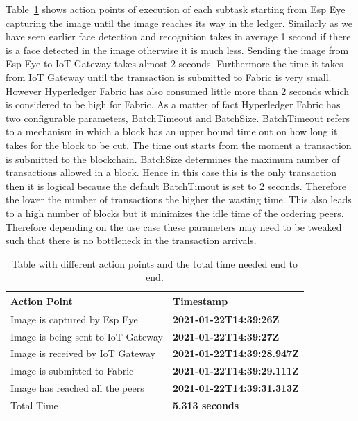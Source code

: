 Table~\ref{actionpoint} shows action points of execution of each subtask starting from Esp Eye capturing the image until the image reaches its way in the ledger. Similarly as we have seen earlier face detection and recognition takes in average 1 second if there is a face detected in the image otherwise it is much less. Sending the image from Esp Eye to IoT Gateway takes almost 2 seconds. Furthermore the time it takes from IoT Gateway until the transaction is submitted to Fabric is very small. 
However Hyperledger Fabric has also consumed little more than 2 seconds which is considered to be high for Fabric. As a matter of fact Hyperledger Fabric has two configurable parameters, BatchTimeout and BatchSize. BatchTimeout refers to a mechanism in which a block has an upper bound time out on how long it takes for the block to be cut. The time out starts from the moment a transaction is submitted to the blockchain. BatchSize determines the maximum number of transactions allowed in a block. 
Hence in this case this is the only transaction then it is logical because the default BatchTimout is set to 2 seconds. Therefore the lower the number of transactions the higher the wasting time. This also leads to a high number of blocks but it minimizes the idle time of the ordering peers. Therefore depending on the use case these parameters may need to be tweaked such that there is no bottleneck in the transaction arrivals.  




\begin{table}[hbt!]

    
    \begin{tabular}{  p{7.4cm}  p{7.4cm}   }
      
\textbf{Action Point}      
& \textbf{Timestamp}   
\\\midrule
Image is captured by Esp Eye & \textbf{2021-01-22T14:39:26Z}         
\\\hline

Image is being sent to IoT Gateway & \textbf{2021-01-22T14:39:27Z}      
 \\\hline
Image is received by IoT Gateway & \textbf{2021-01-22T14:39:28.947Z}   
 \\\hline
Image is submitted to Fabric & \textbf{2021-01-22T14:39:29.111Z}
 \\\hline
Image has reached all the peers  & \textbf{2021-01-22T14:39:31.313Z}
 \\\hline
Total Time & \textbf{5.313 seconds}
 \\
        \bottomrule
    \end{tabular}
    \caption{Table with different action points and the total time needed end to end.}
    \label{actionpoint}
\end{table}



